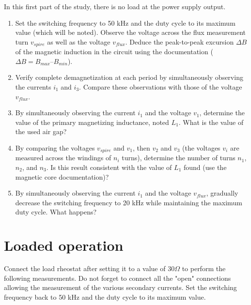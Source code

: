 In this first part of the study, there is no load at the power supply output.

\begin{enumerate}
\item Set the switching frequency to 50 kHz and the duty cycle to its maximum value (which will be noted). Observe the voltage across the flux measurement turn $v_{spire}$ as well as the voltage $v_{flux}$. Deduce the peak-to-peak excursion $\Delta B$ of the magnetic induction in the circuit using the documentation ($\Delta B = B_{max} – B_{min}$).

\item Verify complete demagnetization at each period by simultaneously observing the currents $i_1$ and $i_3$. Compare these observations with those of the voltage $v_{flux}$.

\item By simultaneously observing the current $i_1$ and the voltage $v_1$, determine the value of the primary magnetizing inductance, noted $L_1$. What is the value of the used air gap?

\item By comparing the voltages $v_{spire}$ and $v_1$, then $v_2$ and $v_3$ (the voltages $v_i$ are measured across the windings of $n_i$ turns), determine the number of turns $n_1$, $n_2$, and $n_3$. Is this result consistent with the value of $L_1$ found (use the magnetic core documentation)?

\item By simultaneously observing the current $i_1$ and the voltage $v_{flux}$, gradually decrease the switching frequency to 20 kHz while maintaining the maximum duty cycle. What happens?
\end{enumerate}

\newpage
\section{Loaded operation}

Connect the load rheostat after setting it to a value of $30\Omega$ to perform the following measurements. Do not forget to connect all the "open" connections allowing the measurement of the various secondary currents. Set the switching frequency back to 50 kHz and the duty cycle to its maximum value.


